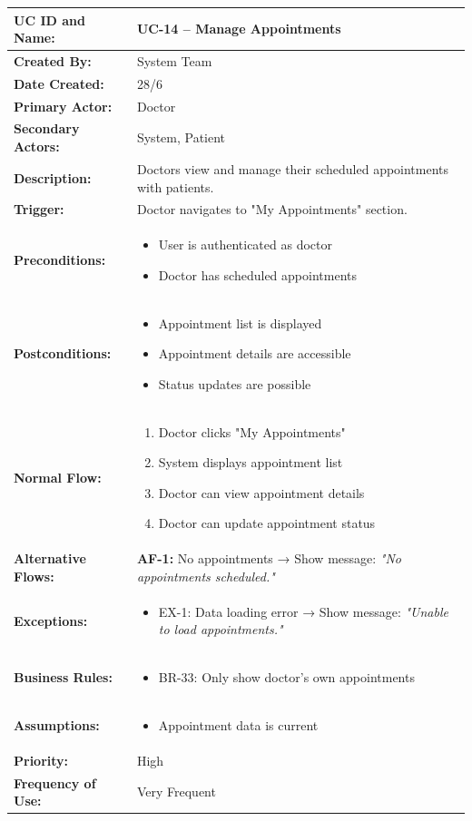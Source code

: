 \documentclass[12pt,a4paper]{article}
\begin{document}
\renewcommand{\arraystretch}{1.5}
\begin{longtable}{|p{4.5cm}|p{10.5cm}|}
\hline
\textbf{UC ID and Name:} & UC-14 – Manage Appointments \\
\hline
\textbf{Created By:} & System Team \\
\hline
\textbf{Date Created:} & 28/6 \\
\hline
\textbf{Primary Actor:} & Doctor \\
\hline
\textbf{Secondary Actors:} & System, Patient \\
\hline
\textbf{Description:} & Doctors view and manage their scheduled appointments with patients. \\
\hline
\textbf{Trigger:} & Doctor navigates to "My Appointments" section. \\
\hline
\textbf{Preconditions:} &
\begin{itemize}
  \item User is authenticated as doctor
  \item Doctor has scheduled appointments
\end{itemize} \\
\hline
\textbf{Postconditions:} &
\begin{itemize}
  \item Appointment list is displayed
  \item Appointment details are accessible
  \item Status updates are possible
\end{itemize} \\
\hline
\textbf{Normal Flow:} &
\begin{enumerate}
  \item Doctor clicks "My Appointments"
  \item System displays appointment list
  \item Doctor can view appointment details
  \item Doctor can update appointment status
\end{enumerate} \\
\hline
\textbf{Alternative Flows:} &
\textbf{AF-1:} No appointments → Show message: \textit{"No appointments scheduled."} \\
\hline
\textbf{Exceptions:} &
\begin{itemize}
  \item EX-1: Data loading error → Show message: \textit{"Unable to load appointments."}
\end{itemize} \\
\hline
\textbf{Business Rules:} &
\begin{itemize}
  \item BR-33: Only show doctor's own appointments
\end{itemize} \\
\hline
\textbf{Assumptions:} &
\begin{itemize}
  \item Appointment data is current
\end{itemize} \\
\hline
\textbf{Priority:} & High \\
\hline
\textbf{Frequency of Use:} & Very Frequent \\
\hline
\end{longtable}
\end{document}
